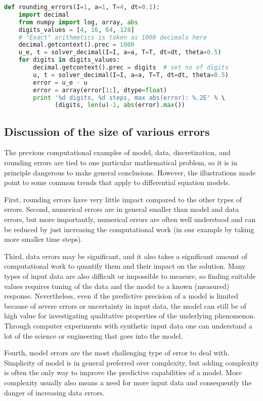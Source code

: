 \documentclass[graybox,sectrefs,envcountresetchap,open=right,final]{svmonodo}
\begin{document}
\begin{lstlisting}[language=Python,style=blue1_bluegreen]
def rounding_errors(I=1, a=1, T=4, dt=0.1):
    import decimal
    from numpy import log, array, abs
    digits_values = [4, 16, 64, 128]
    # "Exact" arithmetics is taken as 1000 decimals here
    decimal.getcontext().prec = 1000
    u_e, t = solver_decimal(I=I, a=a, T=T, dt=dt, theta=0.5)
    for digits in digits_values:
        decimal.getcontext().prec = digits  # set no of digits
        u, t = solver_decimal(I=I, a=a, T=T, dt=dt, theta=0.5)
        error = u_e - u
        error = array(error[1:], dtype=float)
        print '%d digits, %d steps, max abs(error): %.2E' % \ 
              (digits, len(u)-1, abs(error).max())
\end{lstlisting}

\subsection{Discussion of the size of various errors}

The previous computational examples of model, data, discretization,
and rounding errors are tied to one particular mathematical problem,
so it is in principle dangerous to make general conclusions.  However,
the illustrations made point to some common trends that apply to
differential equation models.

First, rounding errors have very little impact compared to the other
types of errors.  Second, numerical errors are in general smaller than
model and data errors, but more importantly, numerical errors are
often well understood and can be reduced by just increasing the
computational work (in our example by taking more smaller time steps).

Third, data errors may be significant, and it also takes a significant
amount of computational work to quantify them and their impact on the
solution. Many types of input data are also difficult or impossible
to measure, so finding suitable values requires tuning of the data
and the model to a known (measured) response.
Nevertheless, even if the predictive precision of a model
is limited because of severe errors or uncertainty in input data, the
model can still be of high value for investigating qualitative
properties of the underlying phenomenon. Through computer experiments
with synthetic input data one can understand a lot of the science or
engineering that goes into the model.

Fourth, model errors are the most challenging type of error to deal
with. Simplicity of model is in general preferred over complexity,
but adding complexity is often the only way to improve the predictive
capabilities of a model. More complexity usually also means a need
for more input data and consequently the danger of increasing
data errors.
\end{document}
